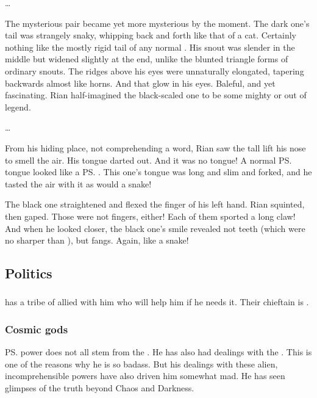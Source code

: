 {  \ldots 
  
  The mysterious pair became yet more mysterious by the moment. 
  The dark one's tail was strangely snaky, whipping back and forth like that of a cat. Certainly nothing like the mostly rigid tail of any normal \scatha. His snout was slender in the middle but widened slightly at the end, unlike the blunted triangle forms of ordinary \scathaese{} snouts. The ridges above his eyes were unnaturally elongated, tapering backwards almost like horns. And that glow in his eyes. Baleful, and yet fascinating. Rian half-imagined the black-scaled one to be some mighty \dragon{} or \daemon{} out of legend. 
  
  \ldots
  
  From his hiding place, not comprehending a word, Rian saw the tall \dax{} lift his nose to smell the air. 
  His tongue darted out. 
  And it was no \scathaese{} tongue! 
  A normal \ps{\scatha} tongue looked like a \ps{\human}. 
  This one's tongue was long and slim and forked, and he tasted the air with it as would a snake!
  
  The black one straightened and flexed the finger of his left hand. 
  Rian squinted, then gaped. 
  Those were not \scathaese{} fingers, either! Each of them sported a long claw! 
  And when he looked closer, the black one's smile revealed not \scathaese{} teeth (which were no sharper than \psp{\humans}), but fangs.
  Again, like a snake! 
}









\subsection{Politics}





\subsubsection{\Baelzerach}
\Ishnaruchaefir{} has a tribe of \Baelzerach{} \resphain{} allied with him who will help him if he needs it. 
Their chieftain is . 





\subsubsection{Cosmic gods}
\ps{\Ishnaruchaefir} power does not all stem from the \xss{}. He has also had dealings with the . This is one of the reasons why he is so badass. But his dealings with these alien, incomprehensible powers have also driven him somewhat mad. He has seen glimpses of the truth beyond Chaos and Darkness. 

